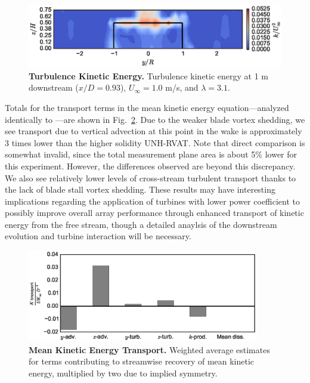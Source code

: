 \documentclass[10pt,letterpaper]{article}
\begin{document}
\begin{figure}[h]
\includegraphics[width=\textwidth]{figures/k_contours}
\caption{{\bf Turbulence Kinetic Energy.}
Turbulence kinetic energy at 1 m downstream ($x/D=0.93$), $U_\infty=1.0$ m/s, and
$\lambda=3.1$.}
\label{fig:kcont}
\end{figure}


Totals for the transport terms in the mean kinetic energy equation---analyzed
identically to \cite{Bachant2015-JoT}---are shown in Fig.~\ref{fig:Ktransport}.
Due to the weaker blade vortex shedding, we see transport due to vertical
advection at this point in the wake is approximately 3 times lower than the
higher solidity UNH-RVAT. Note that direct comparison is somewhat invalid, since
the total measurement plane area is about 5\% lower for this experiment.
However, the differences observed are beyond this discrepancy. We also see
relatively lower levels of cross-stream turbulent transport thanks to the lack
of blade stall vortex shedding. These results may have interesting implications
regarding the application of turbines with lower power coefficient to possibly
improve overall array performance through enhanced transport of kinetic energy
from the free stream, though a detailed anaylsis of the downstream evolution and
turbine interaction will be necessary.

\begin{figure}[ht!]
\includegraphics[width=0.9\textwidth]{figures/K_trans_bar_graph}

\caption{{\bf Mean Kinetic Energy Transport.} Weighted average estimates for
    terms contributing to streamwise recovery of mean kinetic energy, multiplied by
    two due to implied symmetry.}

\label{fig:Ktransport}
\end{figure}
\end{document}

